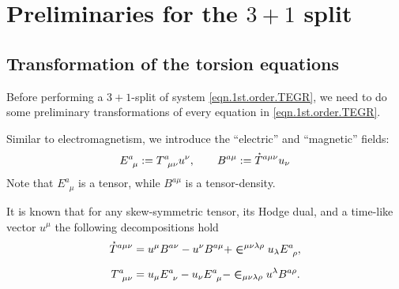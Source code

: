\documentclass[
10pt, %
a4paper, %
oneside, %
twocolumn,
headinclude,footinclude, %
BCOR5mm, %
]{scrartcl}
\newcommand{\Tors}[2]{T^{#1}_{\phantom{#1}#2}}
\newcommand{\ET}[2]{E^{#1}_{\phantom{#1}#2}}	%
\newcommand{\BT}[2]{B^{#1#2}}	%
\newcommand{\LCsymb}{\bm{\in}}    %
\newcommand{\HDT}[1]{\accentset{\star}{T}^{#1}}
\begin{document}
	\section{Preliminaries for the $ 3+1 $ split}\label{sec.31.prep}
	
	
	
	\subsection{Transformation of the torsion equations}\label{sec.transform.potential}
	
	
	Before performing a $ 3+1 $-split \cite{Alcubierre2008} of system \eqref{eqn.1st.order.TEGR}, 
	we 
	need to do some preliminary transformations of every equation in \eqref{eqn.1st.order.TEGR}. 
	
	
	Similar to electromagnetism, we introduce the ``electric'' and ``magnetic''
	fields:
	\begin{equation}
		\ET{a}{\mu} := \Tors{a}{\mu\nu} u^\nu, \qquad  \BT{a}{\mu} := \HDT{a\mu\nu} u_\nu
	\end{equation}
	Note that $ \ET{a}{\mu} $ is a tensor, while $ \BT{a}{\mu}
	$ is a tensor-density.
	
	It is known that for any skew-symmetric tensor, its Hodge dual, and a time-like vector $ u^\mu 
	$ 
	the following 
	decompositions hold
	\begin{subequations}\label{eqn.T.decompos}
		\begin{align}
			\HDT{a\mu\nu} &= u^\mu \BT{a}{\nu} - u^\nu \BT{a}{\mu} + 
			\LCsymb^{\mu\nu\lambda\rho}u_\lambda 
			\ET{a}{\rho},\\[2mm]
			\Tors{a}{\mu\nu} &= u_\mu \ET{a}{\nu} - u_\nu \ET{a}{\mu} - 
			\LCsymb_{\mu\nu\lambda\rho}u^\lambda 
			\BT{a}{\rho}.
		\end{align}
	\end{subequations}
	
\end{document}
